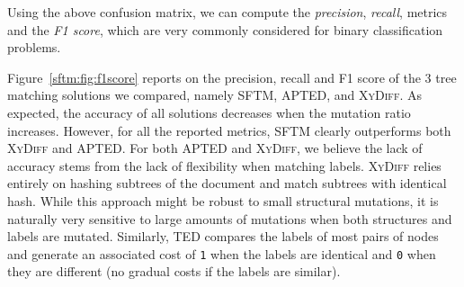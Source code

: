 Using the above confusion matrix, we can compute the \textit{precision}, \textit{recall}, metrics and the \textit{F1 score}, which are very commonly considered for binary classification problems.

Figure~\ref{sftm:fig:f1score} reports on the precision, recall and F1 score of the 3 tree matching solutions we compared, namely SFTM, APTED, and \textsc{XyDiff}.
As expected, the accuracy of all solutions decreases when the mutation ratio increases.
However, for all the reported metrics, SFTM clearly outperforms both \textsc{XyDiff} and APTED.
For both APTED and \textsc{XyDiff}, we believe the lack of accuracy stems from the lack of flexibility when matching labels.
\textsc{XyDiff} relies entirely on hashing subtrees of the document and match subtrees with identical hash.
While this approach might be robust to small structural mutations, it is naturally very sensitive to large amounts of mutations when both structures and labels are mutated.
Similarly, TED compares the labels of most pairs of nodes and generate an associated cost of \texttt{1} when the labels are identical and \texttt{0} when they are different (no gradual costs if the labels are similar).

